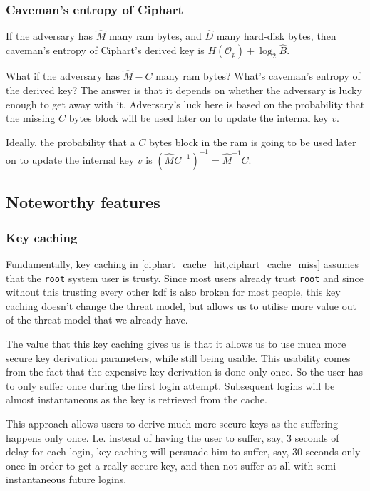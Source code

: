 \documentclass[twocolumn]{article}
\begin{document}
\subsubsection{Caveman's entropy of Ciphart}
If the adversary has $\hat M$ many \gls{ram} bytes, and $\hat D$
many hard-disk bytes, then caveman's entropy of Ciphart's derived
key is $H(\mathcal{O}_p) + \log_2 \hat B$.

What if the adversary has $\hat M - C$ many \gls{ram} bytes?
What's caveman's entropy of the derived key?  The answer is that it depends
on whether the adversary is lucky enough to get away with it.  Adversary's
luck here is based on the probability that the missing $C$ bytes block will
be used later on to update the internal key $v$.

Ideally, the probability that a $C$ bytes block in the \gls{ram} is going
to be used later on to update the internal key $v$ is $(\hat MC^{-1})^{-1}
= \hat M^{-1}C$.

\subsection{Noteworthy features}
\subsubsection{Key caching}
Fundamentally, key caching in \cref{ciphart_cache_hit,ciphart_cache_miss}
assumes that the \texttt{root} system user is trusty.  Since most users
already trust \texttt{root} and since without this trusting every other
\gls{kdf} is also broken for most people, this key caching doesn't change
the threat model, but allows us to utilise more value out of the threat
model that we already have.

The value that this key caching gives us is that it allows us to use much
more secure key derivation parameters, while still being usable.  This
usability comes from the fact that the expensive key derivation is done
only once.  So the user has to only suffer once during the first login
attempt.  Subsequent logins will be almost instantaneous as the key is
retrieved from the cache.  

This approach allows users to derive much more secure keys as the suffering
happens only once.  I.e. instead of having the user to suffer, say, $3$
seconds of delay for each login, key caching will persuade him to suffer,
say, $30$ seconds only once in order to get a really secure key, and then
not suffer at all with semi-instantaneous future logins.
\end{document}

